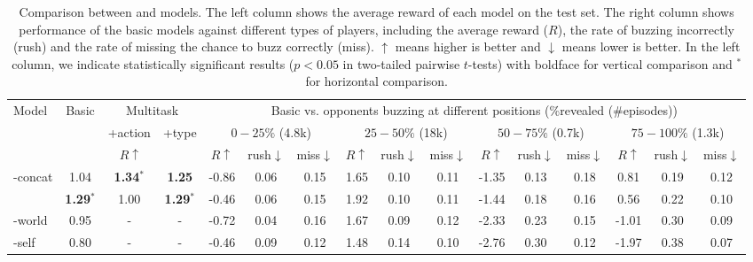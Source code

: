 \begin{table}[t]
\setlength{\tabcolsep}{1.5pt}

\begin{tabular}{lccc@{\hskip 3ex}ccc@{\hskip 3ex}ccc@{\hskip 3ex}ccc@{\hskip 3ex}ccc}
\toprule
\multirow{3}{*}{Model} & \multirow{2}{*}{Basic} & \multicolumn{2}{c}{Multitask} & \multicolumn{12}{c}{Basic vs. opponents buzzing at different positions (\%revealed (\#episodes))} \\
& & +action & +type & \multicolumn{3}{c}{\hspace{-3ex}$0-25\%$ (4.8k)} & \multicolumn{3}{c}{\hspace{-2ex}$25-50\%$ (18k)} & \multicolumn{3}{c}{\hspace{-2ex}$50-75\%$ (0.7k)} & \multicolumn{3}{c}{$75-100\%$ (1.3k)}  \\
\cmidrule(lr){2-4}\cmidrule(lr){5-16}
& \multicolumn{3}{c}{$R\uparrow$} & $R\uparrow$ & rush$\downarrow$ & miss$\downarrow$ & $R\uparrow$ & rush$\downarrow$ & miss$\downarrow$ & $R\uparrow$ & rush$\downarrow$ & miss$\downarrow$ & $R\uparrow$ & rush$\downarrow$ & miss$\downarrow$ \\
\midrule
\dron{}-concat & 1.04 & {\bf 1.34}$^\ast$ & {\bf 1.25} & -0.86 & 0.06 & 0.15 & 1.65 & 0.10 & 0.11 & -1.35 & 0.13 & 0.18 & 0.81 & 0.19 & 0.12 \\
\dronmoe{} & {\bf 1.29}$^\ast$ & 1.00 & {\bf 1.29}$^\ast$ & -0.46 & 0.06 & 0.15 & 1.92 & 0.10 & 0.11 & -1.44 & 0.18 & 0.16 & 0.56 & 0.22 & 0.10 \\
\dqn{}-world & 0.95 & - & - & -0.72 & 0.04 & 0.16 & 1.67 & 0.09 & 0.12 & -2.33 & 0.23 & 0.15 & -1.01 & 0.30 & 0.09 \\
\dqn{}-self & 0.80 & - & - & -0.46 & 0.09 & 0.12 & 1.48 & 0.14 & 0.10 & -2.76 & 0.30 & 0.12 & -1.97 & 0.38 & 0.07 \\
\bottomrule
\end{tabular}

\caption{Comparison between \dron{} and \dqn{} models. The left column shows the average reward of each model on the test set. The right column shows performance of the basic models against different types of players, including the average reward ($R$), the rate of buzzing incorrectly (rush) and the rate of missing the chance to buzz correctly (miss). $\uparrow$ means higher is better and $\downarrow$ means lower is better.
  In the left column, we indicate statistically significant results ($p<0.05$ in two-tailed pairwise $t$-tests) with boldface for vertical comparison and $^\ast$ for horizontal comparison.}
\label{tab:model_result}
\end{table}


